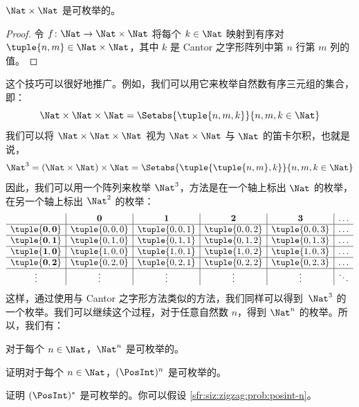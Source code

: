 \documentclass[../../../include/open-logic-section]{subfiles}
\begin{document}
\begin{prop}
$\Nat \times \Nat$ 是可枚举的。
\end{prop}

\begin{proof}
令 $f \colon \Nat \to \Nat\times\Nat$ 将每个 $k \in \Nat$ 映射到有序对 $\tuple{n,m} \in \Nat \times \Nat$，其中 $k$ 是 Cantor 之字形阵列中第 $n$ 行第 $m$ 列的值。
\end{proof}

\begin{explain}
这个技巧可以很好地推广。例如，我们可以用它来枚举自然数有序三元组的集合，即：
\[
\Nat \times \Nat \times \Nat = \Setabs{\tuple{n,m,k}}{n,m,k \in \Nat}
\]
我们可以将 $\Nat \times \Nat \times \Nat$ 视为 $\Nat \times \Nat$ 与 $\Nat$ 的笛卡尔积，也就是说，
\[
\Nat^3 = (\Nat \times \Nat) \times \Nat =
\Setabs{\tuple{\tuple{n,m},k}}{n, m, k
  \in \Nat }
\]
因此，我们可以用一个阵列来枚举 $\Nat^3$，方法是在一个轴上标出 $\Nat$ 的枚举，在另一个轴上标出 $\Nat^2$ 的枚举：
\[
\begin{array}{ c | c | c | c | c | c}
& \mathbf 0 & \mathbf 1 & \mathbf 2 & \mathbf 3 & \dots \\
\hline
\mathbf{\tuple{0,0}} & \tuple{0,0,0} & \tuple{0,0,1} & \tuple{0,0,2} & \tuple{0,0,3} & \dots \\
\hline
\mathbf{\tuple{0,1}} & \tuple{0,1,0} & \tuple{0,1,1} & \tuple{0,1,2} & \tuple{0,1,3} & \dots \\
\hline
\mathbf{\tuple{1,0}} & \tuple{1,0,0} & \tuple{1,0,1} & \tuple{1,0,2} & \tuple{1,0,3} & \dots \\
\hline
\mathbf{\tuple{0,2}} & \tuple{0,2,0} & \tuple{0,2,1} & \tuple{0,2,2} & \tuple{0,2,3} & \dots\\
\hline
\vdots & \vdots & \vdots & \vdots & \vdots & \ddots \\
\end{array}
\]
这样，通过使用与 Cantor 之字形方法类似的方法，我们同样可以得到~$\Nat^3$ 的一个枚举。我们可以继续这个过程，对于任意自然数 $n$，得到 $\Nat^n$ 的枚举。所以，我们有：
\end{explain}

\begin{prop}
对于每个 $n \in \Nat$，$\Nat^n$ 是可枚举的。
\end{prop}

\begin{prob}\label{sfr:siz:zigzag:prob:posint-n}
证明对于每个 $n \in \Nat$，$(\PosInt)^n$ 是可枚举的。
\end{prob}

\begin{prob}\label{sfr:siz:zigzag:prob:posint-star}
  证明 $(\PosInt)^*$ 是可枚举的。你可以假设 \cref{sfr:siz:zigzag:prob:posint-n}。
\end{prob}
\end{document}

